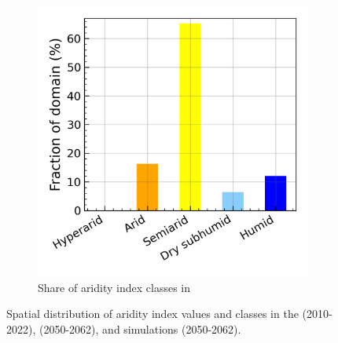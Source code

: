 \begin{figure}[htbp]
\begin{subfigure}[b]{0.31\textwidth}
    \end{subfigure}
    \begin{subfigure}[b]{0.31\textwidth}
        \caption{Share of aridity index classes in \futirr}
        \includegraphics[width=\textwidth]{images/chap4/future/aridity_index_distribution_fut_irr.png}
    \end{subfigure}
    \caption{Spatial distribution of aridity index values and classes in the \presnoirr (2010-2022), \futnoirr (2050-2062), and \futirr simulations (2050-2062).}
    \label{fig:aridity_index_v2}
\end{figure}



